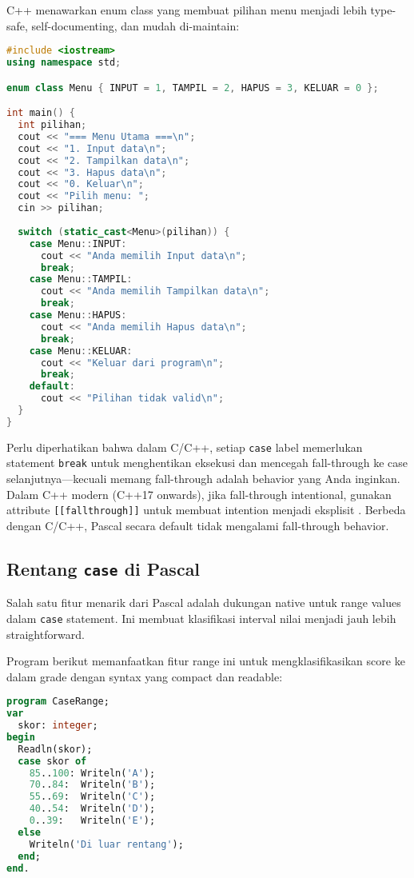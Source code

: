 \documentclass[../main.tex]{subfiles}
\begin{document}
C++ menawarkan enum class yang membuat pilihan menu menjadi lebih type-safe, self-documenting, dan mudah di-maintain:

\begin{lstlisting}[language=C++, caption={Menu dengan switch dan enum di C++}]
#include <iostream>
using namespace std;

enum class Menu { INPUT = 1, TAMPIL = 2, HAPUS = 3, KELUAR = 0 };

int main() {
  int pilihan;
  cout << "=== Menu Utama ===\n";
  cout << "1. Input data\n";
  cout << "2. Tampilkan data\n";
  cout << "3. Hapus data\n";
  cout << "0. Keluar\n";
  cout << "Pilih menu: ";
  cin >> pilihan;
  
  switch (static_cast<Menu>(pilihan)) {
    case Menu::INPUT:
      cout << "Anda memilih Input data\n";
      break;
    case Menu::TAMPIL:
      cout << "Anda memilih Tampilkan data\n";
      break;
    case Menu::HAPUS:
      cout << "Anda memilih Hapus data\n";
      break;
    case Menu::KELUAR:
      cout << "Keluar dari program\n";
      break;
    default:
      cout << "Pilihan tidak valid\n";
  }
}
\end{lstlisting}

Perlu diperhatikan bahwa dalam C/C++, setiap \texttt{case} label memerlukan statement \texttt{break} untuk menghentikan eksekusi dan mencegah fall-through ke case selanjutnya—kecuali memang fall-through adalah behavior yang Anda inginkan. Dalam C++ modern (C++17 onwards), jika fall-through intentional, gunakan attribute \texttt{[[fallthrough]]} untuk membuat intention menjadi eksplisit \parencite{cpp-fallthrough-attr}. Berbeda dengan C/C++, Pascal secara default tidak mengalami fall-through behavior.

\subsection{Rentang \texttt{case} di Pascal}
Salah satu fitur menarik dari Pascal adalah dukungan native untuk range values dalam \texttt{case} statement. Ini membuat klasifikasi interval nilai menjadi jauh lebih straightforward.

Program berikut memanfaatkan fitur range ini untuk mengklasifikasikan score ke dalam grade dengan syntax yang compact dan readable:

\begin{lstlisting}[language=Pascal, caption={Rentang case di Pascal}]
program CaseRange;
var
  skor: integer;
begin
  Readln(skor);
  case skor of
    85..100: Writeln('A');
    70..84:  Writeln('B');
    55..69:  Writeln('C');
    40..54:  Writeln('D');
    0..39:   Writeln('E');
  else
    Writeln('Di luar rentang');
  end;
end.
\end{lstlisting}
\end{document}
